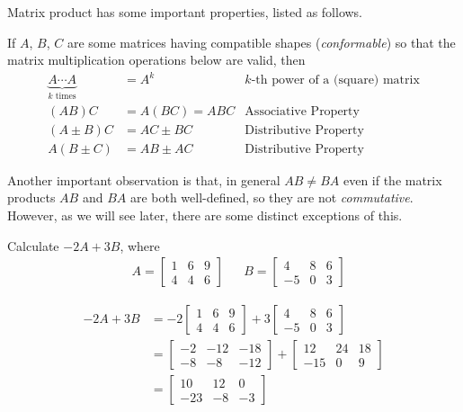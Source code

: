 Matrix product has some important properties, listed as follows.
\begin{proper}
\label{proper:matmul}
If $A$, $B$, $C$ are some matrices having compatible shapes (\textit{conformable}) so that the matrix multiplication operations below are valid, then
\begin{align*}
\underbrace{A\cdots A}_{k \text{ times}} &= A^k &\text{$k$-th power of a (square) matrix} \\
(AB)C &= A(BC) = ABC &\text{Associative Property} \\
(A \pm B)C &= AC \pm BC &\text{Distributive Property} \\
A(B \pm C) &= AB \pm AC &\text{Distributive Property}
\end{align*}
\end{proper}
Another important observation is that, in general $AB \neq BA$ even if the matrix products $AB$ and $BA$ are both well-defined, so they are not \textit{commutative}. However, as we will see later, there are some distinct exceptions of this.
\begin{exmp}
Calculate $-2A + 3B$, where
\begin{align*}
& A = 
\begin{bmatrix}
1 & 6 & 9 \\
4 & 4 & 6 
\end{bmatrix} &
& B = 
\begin{bmatrix}
4 & 8 & 6 \\
-5 & 0 & 3
\end{bmatrix}
\end{align*}
\end{exmp}
\begin{solution}
\begin{align*}
-2A + 3B &= 
-2\begin{bmatrix}
1 & 6 & 9 \\
4 & 4 & 6 
\end{bmatrix}
+3\begin{bmatrix}
4 & 8 & 6 \\
-5 & 0 & 3
\end{bmatrix} \\
&= \begin{bmatrix}
-2 & -12 & -18 \\
-8 & -8 & -12 
\end{bmatrix}
+ \begin{bmatrix}
12 & 24 & 18 \\
-15 & 0 & 9
\end{bmatrix} \\
&= \begin{bmatrix}
10 & 12 & 0 \\
-23 & -8 & -3
\end{bmatrix}
\end{align*}
\end{solution}

